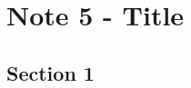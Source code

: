 \documentclass[10pt]{article}
\author{}
\date{}
\begin{document}
\section*{\centering Note 5 - Title}

\subsection*{Section 1}
\end{document}

